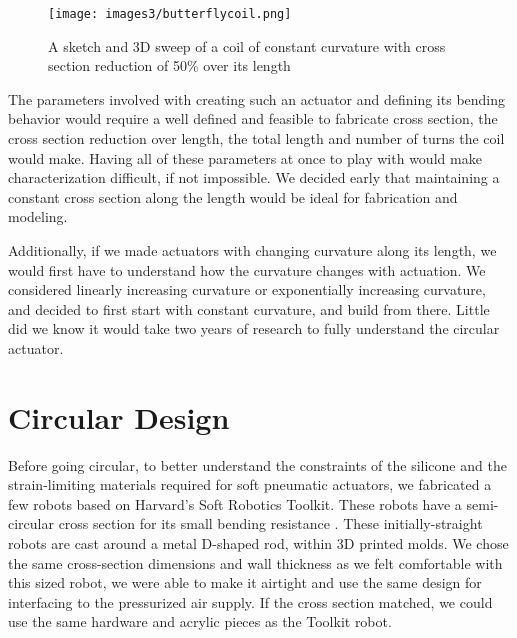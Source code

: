 \begin{figure}[h]
    \centering
    \texttt{[image: images3/butterflycoil.png]}
    \caption{A sketch and 3D sweep of a coil of constant curvature with cross section reduction of 50\% over its length}
    \label{fig:butterflycoil}
\end{figure}

The parameters involved with creating such an actuator and defining its bending behavior would require a well defined and feasible to fabricate cross section, the cross section reduction over length, the total length and number of turns the coil would make. Having all of these parameters at once to play with would make characterization difficult, if not impossible. We decided early that maintaining a constant cross section along the length would be ideal for fabrication and modeling. 

Additionally, if we made actuators with changing curvature along its length, we would first have to understand how the curvature changes with actuation. We considered linearly increasing curvature or exponentially increasing curvature, and decided to first start with constant curvature, and build from there. Little did we know it would take two years of research to fully understand the circular actuator. 

\section{Circular Design}

Before going circular, to better understand the constraints of the silicone and the strain-limiting materials required for soft pneumatic actuators, we fabricated a few robots based on Harvard's Soft Robotics Toolkit. These robots have a semi-circular cross section for its small bending resistance \cite{polygerinos_modeling_2015}. These initially-straight robots are cast around a metal D-shaped rod, within 3D printed molds. We chose the same cross-section dimensions and wall thickness as we felt comfortable with this sized robot, we were able to make it airtight and use the same design for interfacing to the pressurized air supply. If the cross section matched, we could use the same hardware and acrylic pieces as the Toolkit robot. 